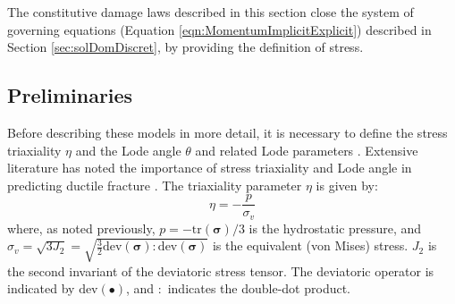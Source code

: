 \documentclass[sn-mathphys,Numbered,draft]{sn-jnl}%
\newcommand{\bb}{\boldsymbol}
\begin{document}
The constitutive damage laws described in this section close the system of governing equations (Equation \ref{eqn:MomentumImplicitExplicit}) described in Section \ref{sec:solDomDiscret}, by providing the definition of stress.


%

\subsection{Preliminaries}
Before describing these models in more detail, it is necessary to define the stress triaxiality $\eta$ and the Lode angle $\theta$ and related Lode parameters \cite{bai_new_2008, nahshon_modification_2008}.
Extensive literature has noted the importance of stress triaxiality and Lode angle in predicting ductile fracture \cite{besson_continuum_2010,cao_models_2017,tekkaya_damage_2020}.
The triaxiality parameter $\eta$ is given by:
\begin{equation} %
    \eta = -\frac{p}{\sigma_{v}}
\end{equation}
where, as noted previously, $p = -\text{tr}(\boldsymbol{\sigma})/3$ is the hydrostatic pressure, and $\sigma_{v} = \sqrt{3 J_2} = \sqrt{\frac{3}{2} \text{dev}(\bb{\sigma}) : \text{dev}(\bb{\sigma}) }$ is the equivalent (von Mises) stress.
$J_2$ is the second invariant of the deviatoric stress tensor.
The deviatoric operator is indicated by $\text{dev}(\bullet)$, and $:$ indicates the double-dot product.
\end{document}
